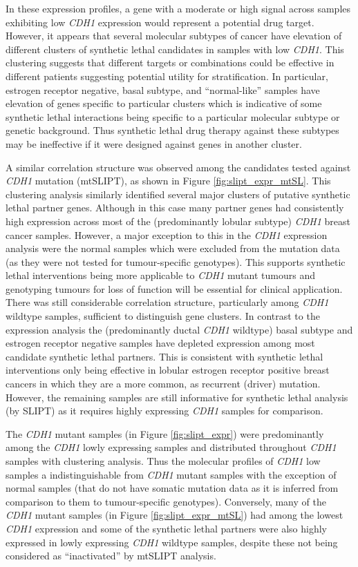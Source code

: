 In these expression profiles, a gene with a moderate or high signal across samples exhibiting low \textit{CDH1} expression would represent a potential drug target. However, it appears that several molecular subtypes of cancer have elevation of different clusters of synthetic lethal candidates in samples with low \textit{CDH1}. This clustering suggests that different targets or combinations could be effective in different patients suggesting potential utility for stratification.  In particular, estrogen receptor negative, basal subtype, and ``normal-like'' samples \cite{Eroles2012, Parker2009, Dai2015} have elevation of genes specific to particular clusters which is indicative of some synthetic lethal interactions being specific to a particular molecular subtype or genetic background. Thus synthetic lethal drug therapy against these subtypes may be ineffective if it were designed against genes in another cluster.
 

A similar correlation structure was observed among the candidates tested against \textit{CDH1} mutation (mtSLIPT), as shown in Figure \ref{fig:slipt_expr_mtSL}. This clustering analysis similarly identified several major clusters of putative synthetic lethal partner genes. Although in this case many partner genes had consistently high expression across most of the (predominantly lobular subtype) \textit{CDH1} breast cancer samples. However, a major exception to this in the \textit{CDH1} expression analysis were the normal samples which were excluded from the mutation data (as they were not tested for tumour-specific genotypes). This supports synthetic lethal interventions being more applicable to \textit{CDH1} mutant tumours and genotyping tumours for loss of function will be essential for clinical application. There was still considerable correlation structure, particularly among \textit{CDH1} wildtype samples, sufficient to distinguish gene clusters. In contrast to the expression analysis the (predominantly ductal \textit{CDH1} wildtype) basal subtype and estrogen receptor negative samples have depleted expression among most candidate synthetic lethal partners. This is consistent with synthetic lethal interventions only being effective in lobular estrogen receptor positive breast cancers in which they are a more common, as recurrent (driver) mutation. However, the remaining samples are still informative for synthetic lethal analysis (by SLIPT) as it requires highly expressing \textit{CDH1} samples for comparison.

The \textit{CDH1} mutant samples (in Figure \ref{fig:slipt_expr}) were predominantly among the \textit{CDH1} lowly expressing samples and distributed throughout \textit{CDH1} samples with clustering analysis. Thus the molecular profiles of \textit{CDH1} low samples a indistinguishable from \textit{CDH1} mutant samples with the exception of normal samples (that do not have somatic mutation data as it is inferred from comparison to them to tumour-specific genotypes). Conversely, many of the \textit{CDH1} mutant samples (in Figure \ref{fig:slipt_expr_mtSL}) had among the lowest \textit{CDH1} expression and some of the synthetic lethal partners were also highly expressed in lowly expressing \textit{CDH1} wildtype samples, despite these not being considered as ``inactivated'' by mtSLIPT analysis.

